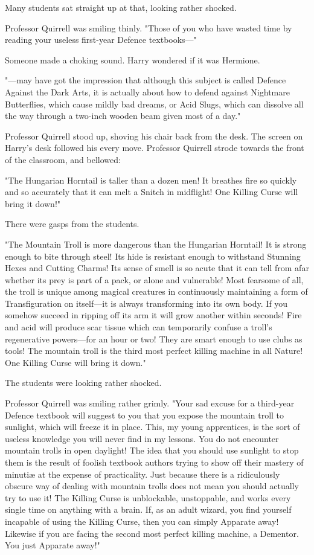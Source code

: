 Many students sat straight up at that, looking rather shocked.

Professor Quirrell was smiling thinly. "Those of you who have wasted time by
reading your useless first-year Defence textbooks—"

Someone made a choking sound. Harry wondered if it was Hermione.

"—may have got the impression that although this subject is called Defence
Against the Dark Arts, it is actually about how to defend against Nightmare
Butterflies, which cause mildly bad dreams, or Acid Slugs, which can dissolve
all the way through a two-inch wooden beam given most of a day."

Professor Quirrell stood up, shoving his chair back from the desk. The screen
on Harry’s desk followed his every move. Professor Quirrell strode towards the
front of the classroom, and bellowed:

"The Hungarian Horntail is taller than a dozen men! It breathes fire so quickly
and so accurately that it can melt a Snitch in midflight! One Killing Curse
will bring it down!"

There were gasps from the students.

"The Mountain Troll is more dangerous than the Hungarian Horntail! It is strong
enough to bite through steel! Its hide is resistant enough to withstand
Stunning Hexes and Cutting Charms! Its sense of smell is so acute that it can
tell from afar whether its prey is part of a pack, or alone and vulnerable!
Most fearsome of all, the troll is unique among magical creatures in
continuously maintaining a form of Transfiguration on itself—it is always
transforming into its own body. If you somehow succeed in ripping off its arm
it will grow another within seconds! Fire and acid will produce scar tissue
which can temporarily confuse a troll’s regenerative powers—for an hour or
two! They are smart enough to use clubs as tools! The mountain troll is the
third most perfect killing machine in all Nature! One Killing Curse will bring
it down."

The students were looking rather shocked.

Professor Quirrell was smiling rather grimly. "Your sad excuse for a third-year
Defence textbook will suggest to you that you expose the mountain troll to
sunlight, which will freeze it in place. This, my young apprentices, is the
sort of useless knowledge you will never find in my lessons. You do not
encounter mountain trolls in open daylight! The idea that you should use
sunlight to stop them is the result of foolish textbook authors trying to show
off their mastery of minutiæ at the expense of practicality. Just because there
is a ridiculously obscure way of dealing with mountain trolls does not mean you
should actually try to use it! The Killing Curse is unblockable, unstoppable,
and works every single time on anything with a brain. If, as an adult wizard,
you find yourself incapable of using the Killing Curse, then you can simply
Apparate away! Likewise if you are facing the second most perfect killing
machine, a Dementor. You just Apparate away!"

